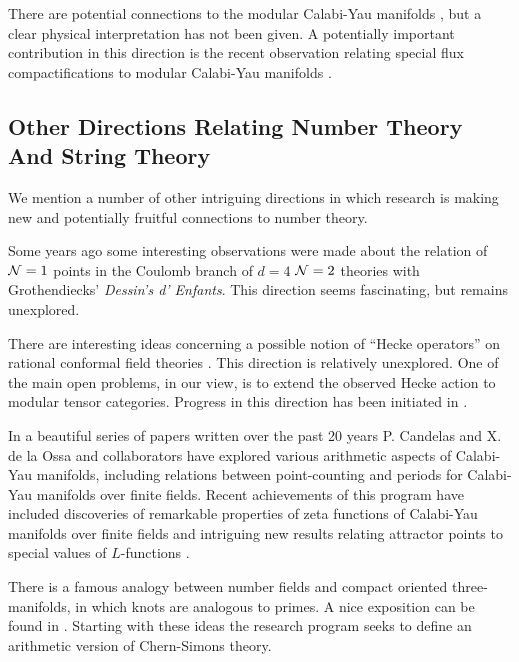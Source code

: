 \documentclass[12pt]{article}
\begin{document}
 
There are potential connections to the modular 
Calabi-Yau manifolds \cite{yui2012modularity,Yui:2017ixa},  but a clear physical interpretation 
has not been given. A potentially important contribution in 
this direction is the   recent observation relating special flux compactifications to 
modular Calabi-Yau manifolds \cite{Kachru:2020sio}.
  


\subsection{Other Directions Relating Number Theory And String Theory}\label{subsec:OtherNumberTheory}

We mention a number of other intriguing directions in which research 
is making new and potentially fruitful connections to number theory. 

Some years ago  \cite{Ashok:2006br} 
some interesting observations were made about the 
relation of ${\cal{N}}=1$ points in the Coulomb branch of 
$d=4$ ${\cal N}=2$ theories with Grothendiecks' \emph{Dessin's d' Enfants}. This 
direction seems fascinating, but remains unexplored. 

There are interesting ideas concerning a possible 
notion of ``Hecke operators'' on rational conformal field theories \cite{Bae:2020pvv,Harvey:2018rdc,
Harvey:2019qzs}. This direction is relatively unexplored. One of the main 
open problems, in our view, is to extend the observed Hecke action to modular tensor categories. 
Progress in this direction has been initiated in \cite{Harvey:2019qzs}. 


In a beautiful series of papers written over the past 20 years 
\cite{Candelas:2000fq,Candelas:2004sk,Candelas:2007mb,
Candelas:2019llw,Candelas:2021mwz,Candelas:2021tqt}
P. Candelas and X. de la Ossa and collaborators have explored 
various arithmetic aspects of Calabi-Yau manifolds, including 
relations between point-counting and periods for Calabi-Yau manifolds
over finite fields. Recent achievements of this program have included 
discoveries of remarkable properties of zeta functions of Calabi-Yau manifolds 
over finite fields \cite{Candelas:2021tqt} and 
intriguing new results relating attractor points to special values of 
$L$-functions \cite{Candelas:2021mwz}. 

There is a famous analogy between number fields and compact oriented 
three-manifolds, in which knots are analogous to primes. A nice 
exposition can be found in \cite{morishita2009analogies}. Starting 
with these ideas the research program 
\cite{Chung:2016gxx,Chung:2019ekx,Kim:2015dzy,Kim:2017eyv}
seeks to define an arithmetic version of Chern-Simons theory.  
\end{document}
